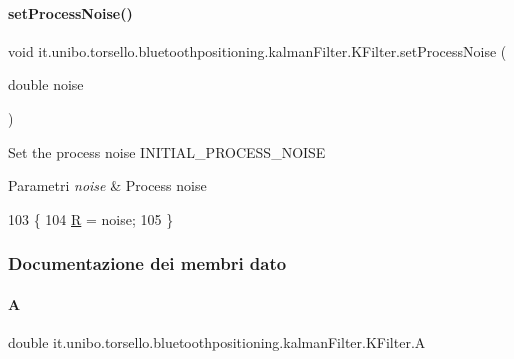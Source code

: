\paragraph{\texorpdfstring{set\+Process\+Noise()}{setProcessNoise()}}
{\footnotesize\ttfamily void it.\+unibo.\+torsello.\+bluetoothpositioning.\+kalman\+Filter.\+K\+Filter.\+set\+Process\+Noise (\begin{DoxyParamCaption}\item[{double}]{noise }\end{DoxyParamCaption})}

Set the process noise I\+N\+I\+T\+I\+A\+L\+\_\+\+P\+R\+O\+C\+E\+S\+S\+\_\+\+N\+O\+I\+SE


\begin{DoxyParams}{Parametri}
{\em noise} & Process noise \\
\hline
\end{DoxyParams}

\begin{DoxyCode}
103                                               \{
104         \hyperlink{classit_1_1unibo_1_1torsello_1_1bluetoothpositioning_1_1kalmanFilter_1_1KFilter_a8dd220ba0a0b0f20c368b13efeb1fe43_a8dd220ba0a0b0f20c368b13efeb1fe43}{R} = noise;
105     \}
\end{DoxyCode}


\subsubsection{Documentazione dei membri dato}
\hypertarget{classit_1_1unibo_1_1torsello_1_1bluetoothpositioning_1_1kalmanFilter_1_1KFilter_a1f75be34a39e81ee7566035f9a8ff11e_a1f75be34a39e81ee7566035f9a8ff11e}{}\label{classit_1_1unibo_1_1torsello_1_1bluetoothpositioning_1_1kalmanFilter_1_1KFilter_a1f75be34a39e81ee7566035f9a8ff11e_a1f75be34a39e81ee7566035f9a8ff11e} 
\paragraph{\texorpdfstring{A}{A}}
{\footnotesize\ttfamily double it.\+unibo.\+torsello.\+bluetoothpositioning.\+kalman\+Filter.\+K\+Filter.\+A\hspace{0.3cm}{\ttfamily [private]}}

